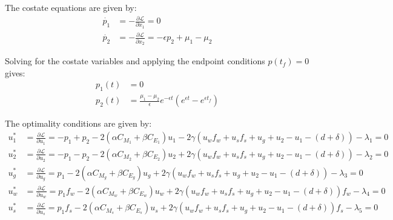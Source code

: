 \documentclass[12pt]{article}
\begin{document}
The costate equations are given by:
\begin{align*}
    \dot{p_1} &= -\frac{\partial \mathcal{L}}{\partial x_1} = 0 \\
    \dot{p_2} &= -\frac{\partial \mathcal{L}}{\partial x_2} = -\epsilon p_2 + \mu_1 - \mu_2
\end{align*}

Solving for the costate variables and applying the endpoint conditions $p(t_f) = 0$  gives:
\begin{align*}
    p_1(t) &= 0 \\
    p_2(t) &= \frac{\mu_1 - \mu_2}{\epsilon}e^{-\epsilon t}(e^{\epsilon t}-e^{\epsilon t_f})
\end{align*}


The optimality conditions are given by:
\begin{align*}
    u_1^* &= \frac{\partial \mathcal{L}}{\partial u_1} = -p_1 + p_2 - 2(\alpha C_{M_1} + \beta C_{E_1})u_1 - 2\gamma (u_w f_w + u_s f_s + u_g + u_2 - u_1 - (d + \delta)) - \lambda_1 = 0 \\
    u_2^* &= \frac{\partial \mathcal{L}}{\partial u_2} = -p_1 - p_2 - 2(\alpha C_{M_2} + \beta C_{E_2})u_2 + 2\gamma (u_w f_w + u_s f_s + u_g + u_2 - u_1 - (d + \delta)) - \lambda_2 = 0 \\
    u_g^* &= \frac{\partial \mathcal{L}}{\partial u_g} = p_1 - 2(\alpha C_{M_g} + \beta C_{E_g})u_g + 2\gamma (u_w f_w + u_s f_s + u_g + u_2 - u_1 - (d + \delta)) - \lambda_3 = 0\\
    u_w^* &= \frac{\partial \mathcal{L}}{\partial u_w} = p_1f_w - 2(\alpha C_{M_w} + \beta C_{E_w})u_w + 2\gamma (u_w f_w + u_s f_s + u_g + u_2 - u_1 - (d + \delta))f_w - \lambda_4 = 0\\
    u_s^* &= \frac{\partial \mathcal{L}}{\partial u_s} = p_1f_s - 2(\alpha C_{M_s} + \beta C_{E_s})u_s + 2\gamma (u_w f_w + u_s f_s + u_g + u_2 - u_1 - (d + \delta))f_s - \lambda_5 = 0
\end{align*}
\end{document}
